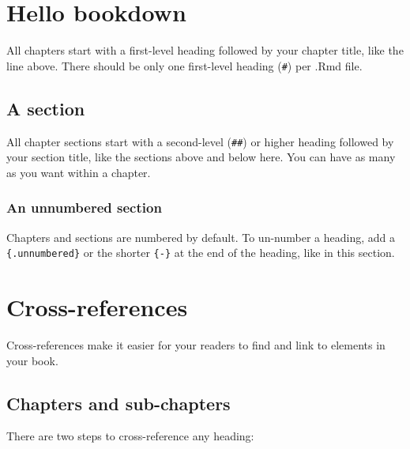 \documentclass[
  xelatex, ja=standard]{bxjsbook}
\theoremstyle{definition}
\theoremstyle{definition}
\theoremstyle{definition}
\theoremstyle{definition}
\theoremstyle{remark}
\begin{document}
\hypertarget{hello-bookdown}{%
\section{Hello bookdown}\label{hello-bookdown}}

All chapters start with a first-level heading followed by your chapter title, like the line above. There should be only one first-level heading (\texttt{\#}) per .Rmd file.

\hypertarget{a-section}{%
\subsection{A section}\label{a-section}}

All chapter sections start with a second-level (\texttt{\#\#}) or higher heading followed by your section title, like the sections above and below here. You can have as many as you want within a chapter.

\hypertarget{an-unnumbered-section}{%
\subsubsection*{An unnumbered section}\label{an-unnumbered-section}}

Chapters and sections are numbered by default. To un-number a heading, add a \texttt{\{.unnumbered\}} or the shorter \texttt{\{-\}} at the end of the heading, like in this section.

\hypertarget{cross}{%
\section{Cross-references}\label{cross}}

Cross-references make it easier for your readers to find and link to elements in your book.

\hypertarget{chapters-and-sub-chapters}{%
\subsection{Chapters and sub-chapters}\label{chapters-and-sub-chapters}}

There are two steps to cross-reference any heading:
\end{document}
